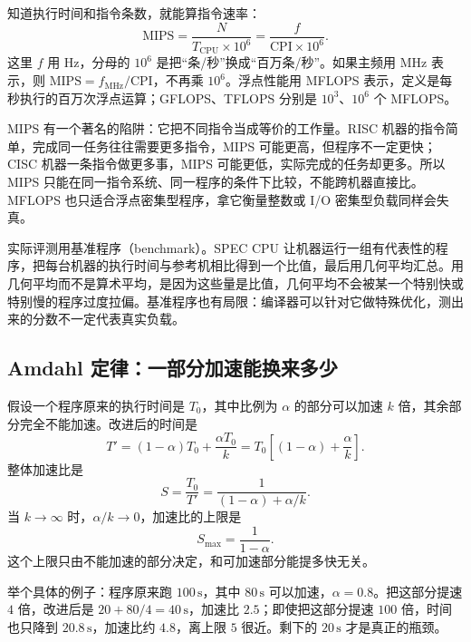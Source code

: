 知道执行时间和指令条数，就能算指令速率：
\[
\mathrm{MIPS}=\frac{N}{T_{\text{CPU}}\times10^{6}}
=\frac{f}{\mathrm{CPI}\times10^{6}}.
\]
这里 $f$ 用 Hz，分母的 $10^{6}$ 是把“条/秒”换成“百万条/秒”。如果主频用 MHz 表示，则 $\mathrm{MIPS}=f_{\text{MHz}}/\mathrm{CPI}$，不再乘 $10^{6}$。浮点性能用 MFLOPS 表示，定义是每秒执行的百万次浮点运算；GFLOPS、TFLOPS 分别是 $10^{3}$、$10^{6}$ 个 MFLOPS。

MIPS 有一个著名的陷阱：它把不同指令当成等价的工作量。RISC 机器的指令简单，完成同一任务往往需要更多指令，MIPS 可能更高，但程序不一定更快；CISC 机器一条指令做更多事，MIPS 可能更低，实际完成的任务却更多。所以 MIPS 只能在同一指令系统、同一程序的条件下比较，不能跨机器直接比。MFLOPS 也只适合浮点密集型程序，拿它衡量整数或 I/O 密集型负载同样会失真。

实际评测用基准程序（benchmark）。SPEC CPU 让机器运行一组有代表性的程序，把每台机器的执行时间与参考机相比得到一个比值，最后用几何平均汇总。用几何平均而不是算术平均，是因为这些量是比值，几何平均不会被某一个特别快或特别慢的程序过度拉偏。基准程序也有局限：编译器可以针对它做特殊优化，测出来的分数不一定代表真实负载。

\subsection{Amdahl 定律：一部分加速能换来多少}

假设一个程序原来的执行时间是 $T_0$，其中比例为 $\alpha$ 的部分可以加速 $k$ 倍，其余部分完全不能加速。改进后的时间是
\[
T'=(1-\alpha)T_0+\frac{\alpha T_0}{k}
=T_0\left[(1-\alpha)+\frac{\alpha}{k}\right].
\]
整体加速比是
\[
S=\frac{T_0}{T'}=\frac{1}{(1-\alpha)+\alpha/k}.
\]
当 $k\to\infty$ 时，$\alpha/k\to0$，加速比的上限是
\[
S_{\max}=\frac{1}{1-\alpha}.
\]
这个上限只由不能加速的部分决定，和可加速部分能提多快无关。

举个具体的例子：程序原来跑 $100\,\mathrm{s}$，其中 $80\,\mathrm{s}$ 可以加速，$\alpha=0.8$。把这部分提速 $4$ 倍，改进后是 $20+80/4=40\,\mathrm{s}$，加速比 $2.5$；即使把这部分提速 $100$ 倍，时间也只降到 $20.8\,\mathrm{s}$，加速比约 $4.8$，离上限 $5$ 很近。剩下的 $20\,\mathrm{s}$ 才是真正的瓶颈。

